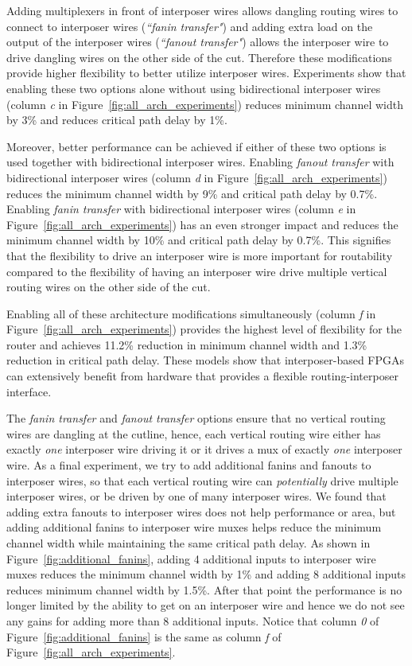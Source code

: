 \documentclass{sig-alternate-2013}
\begin{document}
Adding multiplexers in front of interposer wires allows dangling routing wires to connect to interposer wires (\textit{``fanin transfer"}) and adding extra load on the output of the interposer wires (\textit{``fanout transfer"}) allows the interposer wire to drive dangling wires on the other side of the cut. Therefore these modifications provide higher flexibility to better utilize interposer wires. Experiments show that enabling these two options alone without using bidirectional interposer wires (column \textit{c} in Figure~\ref{fig:all_arch_experiments}) reduces minimum channel width by 3\% and reduces critical path delay by 1\%. 

Moreover, better performance can be achieved if either of these two options is used together with bidirectional interposer wires. Enabling \textit{fanout transfer} with bidirectional interposer wires (column \textit{d} in Figure~\ref{fig:all_arch_experiments}) reduces the minimum channel width by 9\% and critical path delay by 0.7\%. Enabling \textit{fanin transfer} with bidirectional interposer wires (column \textit{e} in Figure~\ref{fig:all_arch_experiments}) has an even stronger impact and reduces the minimum channel width by 10\% and critical path delay by 0.7\%. This signifies that the flexibility to drive an interposer wire is more important for routability compared to the flexibility of having an interposer wire drive multiple vertical routing wires on the other side of the cut.

Enabling all of these architecture modifications simultaneously (column \textit{f} in Figure~\ref{fig:all_arch_experiments}) provides the highest level of flexibility for the router and achieves 11.2\% reduction in minimum channel width and 1.3\% reduction in critical path delay. These models show that interposer-based FPGAs can extensively benefit from hardware that provides a flexible routing-interposer interface.

The \textit{fanin transfer} and \textit{fanout transfer} options ensure that no vertical routing wires are dangling at the cutline, hence, each vertical routing wire either has exactly \textit{one} interposer wire driving it or it drives a mux of exactly \textit{one} interposer wire. As a final experiment, we try to add additional fanins and fanouts to interposer wires, so that each vertical routing wire can \textit{potentially} drive multiple interposer wires, or be driven by one of many interposer wires. We found that adding extra fanouts to interposer wires does not help performance or area, but adding additional fanins to interposer wire muxes helps reduce the minimum channel width while maintaining the same critical path delay. As shown in Figure~\ref{fig:additional_fanins}, adding 4 additional inputs to interposer wire muxes reduces the minimum channel width by 1\% and adding 8 additional inputs reduces minimum channel width by 1.5\%. After that point the performance is no longer limited by the ability to get on an interposer wire and hence we do not see any gains for adding more than 8 additional inputs. Notice that column \textit{0} of Figure~\ref{fig:additional_fanins} is the same as column \textit{f} of Figure~\ref{fig:all_arch_experiments}.
\end{document}

